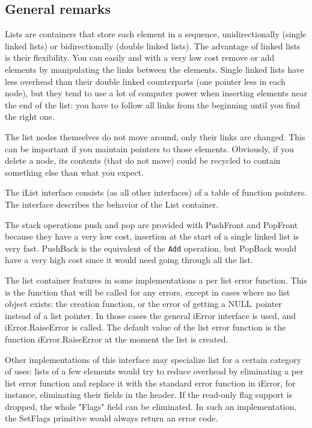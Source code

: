\documentclass[12pt,a4paper]{memoir} %
\newif\iftth
\newcommand{\Null}{{\iftth \ NULL \else \footnotesize NULL\  \fi}}
\newlength{\drop}
\begin{document}
\subsection{General remarks}
Lists are containers that store each element in a sequence, unidirectionally (single linked lists) or bidirectionally (double linked lists).
The advantage of linked lists is their flexibility. You can easily and with a very low cost remove or add elements by manipulating the links between the elements. Single linked lists have less overhead than their double linked counterparts (one pointer less in each node), but they tend to use a lot of computer power when inserting elements near the end of the list: you have to follow all links from the beginning until you find the right one.

The list nodes themselves do not move around, only their links are changed. This can be important if you maintain pointers to those elements. Obviously, if you delete a node, its contents (that do not move) could be recycled to contain something else than what you expect.

The iList interface consists (as all other interfaces) of a table of function pointers. The interface describes the behavior of the List container.

The stack operations push and pop are provided with PushFront and PopFront because they have a very low cost, insertion at the start of a single linked list is very fast. PushBack is the equivalent of the \verb,Add, operation, but PopBack would have a very high cost since it would need going through all the list. 

The list container features in some implementations a per list error function.  This is the function that will be called for any errors, except in  
cases where no list object exists: the creation function, or the error of getting a \Null pointer instead of a list pointer. In those cases the general 
iError interface is used, and iError.RaiseError is called. The default value of the list error function is the function iError.RaiseError at the moment 
the list is created.

Other implementations of this interface may specialize list for a certain category of uses: lists of a few elements would try to reduce overhead by 
eliminating a per list error function and replace it with the standard error function in iError, for instance, eliminating their fields in the header. 
If the read-only flag support is dropped, the whole "Flags" field can be eliminated. In such an implementation, the SetFlags primitive would always 
return an error code.
\end{document}
